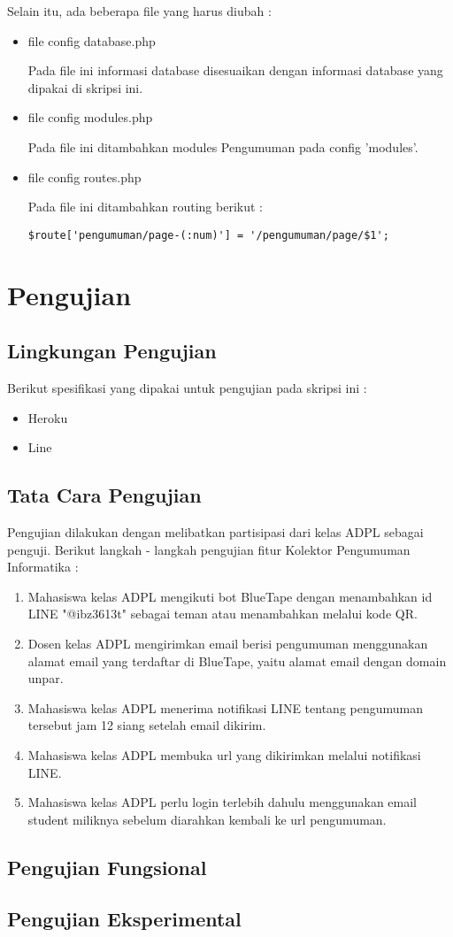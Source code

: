Selain itu, ada beberapa file yang harus diubah :
\begin{itemize}
\item file config database.php

Pada file ini informasi database disesuaikan dengan informasi database yang dipakai di skripsi ini.

\item file config modules.php

Pada file ini ditambahkan modules Pengumuman pada config 'modules'.

\item file config routes.php

Pada file ini ditambahkan routing berikut :
\begin{lstlisting}
$route['pengumuman/page-(:num)'] = '/pengumuman/page/$1';
\end{lstlisting}
\end{itemize}

\section{Pengujian}
\subsection{Lingkungan Pengujian}
Berikut spesifikasi yang dipakai untuk pengujian pada skripsi ini :
\begin{itemize}
\item Heroku
\item Line
\end{itemize}

\subsection{Tata Cara Pengujian}
Pengujian dilakukan dengan melibatkan partisipasi dari kelas ADPL sebagai penguji. Berikut langkah - langkah pengujian fitur Kolektor Pengumuman Informatika :
\begin{enumerate}
\item Mahasiswa kelas ADPL mengikuti bot BlueTape dengan menambahkan id LINE "@ibz3613t" sebagai teman atau menambahkan melalui kode QR.
\item Dosen kelas ADPL mengirimkan email berisi pengumuman menggunakan alamat email yang terdaftar di BlueTape, yaitu alamat email dengan domain unpar.
\item Mahasiswa kelas ADPL menerima notifikasi LINE tentang pengumuman tersebut jam 12 siang setelah email dikirim.
\item Mahasiswa kelas ADPL membuka url yang dikirimkan melalui notifikasi LINE.
\item Mahasiswa kelas ADPL perlu login terlebih dahulu menggunakan email student miliknya sebelum diarahkan kembali ke url pengumuman.
\end{enumerate} 

\subsection{Pengujian Fungsional}

\subsection{Pengujian Eksperimental}